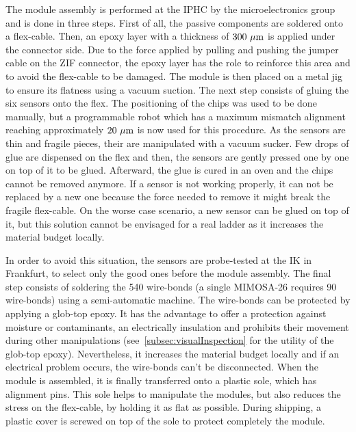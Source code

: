     The module assembly is performed at the IPHC by the microelectronics group and is done in three steps.
    First of all, the passive components are soldered onto a flex-cable.
    Then, an epoxy layer with a thickness of $300~\mu\rm{m}$ is applied under the connector side.
    Due to the force applied by pulling and pushing the jumper cable on the ZIF connector, the epoxy layer has the role to reinforce this area and to avoid the flex-cable to be damaged.
    The module is then placed on a metal jig to ensure its flatness using a vacuum suction.
    The next step consists of gluing the six sensors onto the flex.
    The positioning of the chips was used to be done manually, but a programmable robot which has a maximum mismatch alignment reaching approximately $20~\mu\rm{m}$ is now used for this procedure.
    As the sensors are thin and fragile pieces, their are manipulated with a vacuum sucker.
    Few drops of glue are dispensed on the flex and then, the sensors are gently pressed one by one on top of it to be glued.
    Afterward, the glue is cured in an oven and the chips cannot be removed anymore.
    If a sensor is not working properly, it can not be replaced by a new one because the force needed to remove it might break the fragile flex-cable.
    On the worse case scenario, a new sensor can be glued on top of it, but this solution cannot be envisaged for a real ladder as it increases the material budget locally.
    
    In order to avoid this situation, the sensors are probe-tested at the IK in Frankfurt, to select only the good ones before the module assembly.
    The final step consists of soldering the 540 wire-bonds (a single MIMOSA-26 requires 90 wire-bonds) using a semi-automatic machine.
    The wire-bonds can be protected by applying a glob-top epoxy.
    It has the advantage to offer a protection against moisture or contaminants, an electrically insulation and prohibits their movement during other manipulations (see~\ref{subsec:visualInspection} for the utility of the glob-top epoxy). 
    Nevertheless, it increases the material budget locally and if an electrical problem occurs, the wire-bonds can't be disconnected.
    When the module is assembled, it is finally transferred onto a plastic sole, which has alignment pins.
    This sole helps to manipulate the modules, but also reduces the stress on the flex-cable, by holding it as flat as possible.
    During shipping, a plastic cover is screwed on top of the sole to protect completely the module.

